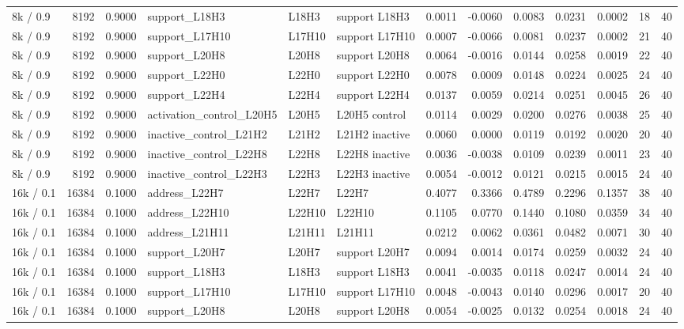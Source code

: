 \begin{tabular}{lrrlllrrrrrrr}
8k / 0.9 & 8192 & 0.9000 & support_L18H3 & L18H3 & support L18H3 & 0.0011 & -0.0060 & 0.0083 & 0.0231 & 0.0002 & 18 & 40 \\
8k / 0.9 & 8192 & 0.9000 & support_L17H10 & L17H10 & support L17H10 & 0.0007 & -0.0066 & 0.0081 & 0.0237 & 0.0002 & 21 & 40 \\
8k / 0.9 & 8192 & 0.9000 & support_L20H8 & L20H8 & support L20H8 & 0.0064 & -0.0016 & 0.0144 & 0.0258 & 0.0019 & 22 & 40 \\
8k / 0.9 & 8192 & 0.9000 & support_L22H0 & L22H0 & support L22H0 & 0.0078 & 0.0009 & 0.0148 & 0.0224 & 0.0025 & 24 & 40 \\
8k / 0.9 & 8192 & 0.9000 & support_L22H4 & L22H4 & support L22H4 & 0.0137 & 0.0059 & 0.0214 & 0.0251 & 0.0045 & 26 & 40 \\
8k / 0.9 & 8192 & 0.9000 & activation_control_L20H5 & L20H5 & L20H5 control & 0.0114 & 0.0029 & 0.0200 & 0.0276 & 0.0038 & 25 & 40 \\
8k / 0.9 & 8192 & 0.9000 & inactive_control_L21H2 & L21H2 & L21H2 inactive & 0.0060 & 0.0000 & 0.0119 & 0.0192 & 0.0020 & 20 & 40 \\
8k / 0.9 & 8192 & 0.9000 & inactive_control_L22H8 & L22H8 & L22H8 inactive & 0.0036 & -0.0038 & 0.0109 & 0.0239 & 0.0011 & 23 & 40 \\
8k / 0.9 & 8192 & 0.9000 & inactive_control_L22H3 & L22H3 & L22H3 inactive & 0.0054 & -0.0012 & 0.0121 & 0.0215 & 0.0015 & 24 & 40 \\
16k / 0.1 & 16384 & 0.1000 & address_L22H7 & L22H7 & L22H7 & 0.4077 & 0.3366 & 0.4789 & 0.2296 & 0.1357 & 38 & 40 \\
16k / 0.1 & 16384 & 0.1000 & address_L22H10 & L22H10 & L22H10 & 0.1105 & 0.0770 & 0.1440 & 0.1080 & 0.0359 & 34 & 40 \\
16k / 0.1 & 16384 & 0.1000 & address_L21H11 & L21H11 & L21H11 & 0.0212 & 0.0062 & 0.0361 & 0.0482 & 0.0071 & 30 & 40 \\
16k / 0.1 & 16384 & 0.1000 & support_L20H7 & L20H7 & support L20H7 & 0.0094 & 0.0014 & 0.0174 & 0.0259 & 0.0032 & 24 & 40 \\
16k / 0.1 & 16384 & 0.1000 & support_L18H3 & L18H3 & support L18H3 & 0.0041 & -0.0035 & 0.0118 & 0.0247 & 0.0014 & 24 & 40 \\
16k / 0.1 & 16384 & 0.1000 & support_L17H10 & L17H10 & support L17H10 & 0.0048 & -0.0043 & 0.0140 & 0.0296 & 0.0017 & 20 & 40 \\
16k / 0.1 & 16384 & 0.1000 & support_L20H8 & L20H8 & support L20H8 & 0.0054 & -0.0025 & 0.0132 & 0.0254 & 0.0018 & 24 & 40 \\

\end{tabular}

